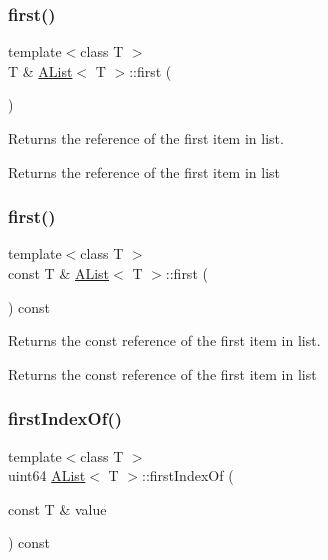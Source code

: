 \subsubsection{\texorpdfstring{first()}{first()}\hspace{0.1cm}{\footnotesize\ttfamily [1/2]}}
{\footnotesize\ttfamily template$<$class T $>$ \\
T \& \mbox{\hyperlink{class_a_list}{A\+List}}$<$ T $>$\+::first (\begin{DoxyParamCaption}{ }\end{DoxyParamCaption})}



Returns the reference of the first item in list. 

\begin{DoxyReturn}{Returns}
the reference of the first item in list 
\end{DoxyReturn}
\mbox{\label{class_a_list_a1cf9c09ee90e96a5f72a39344f8240be}} 
\subsubsection{\texorpdfstring{first()}{first()}\hspace{0.1cm}{\footnotesize\ttfamily [2/2]}}
{\footnotesize\ttfamily template$<$class T $>$ \\
const T \& \mbox{\hyperlink{class_a_list}{A\+List}}$<$ T $>$\+::first (\begin{DoxyParamCaption}{ }\end{DoxyParamCaption}) const}



Returns the const reference of the first item in list. 

\begin{DoxyReturn}{Returns}
the const reference of the first item in list 
\end{DoxyReturn}
\mbox{\label{class_a_list_a9cba56b6076ef86c44e42f4221d80421}} 
\subsubsection{\texorpdfstring{firstIndexOf()}{firstIndexOf()}}
{\footnotesize\ttfamily template$<$class T $>$ \\
uint64 \mbox{\hyperlink{class_a_list}{A\+List}}$<$ T $>$\+::first\+Index\+Of (\begin{DoxyParamCaption}\item[{const T \&}]{value }\end{DoxyParamCaption}) const}



